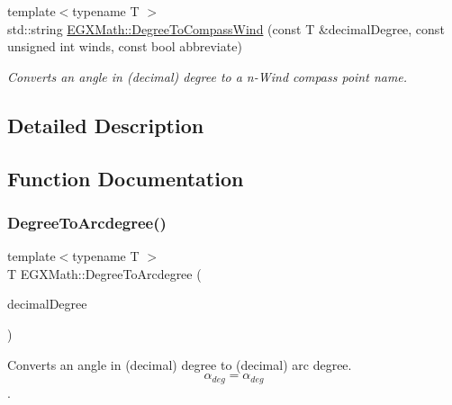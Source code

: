 \begin{DoxyCompactItemize}
{\footnotesize template$<$typename T $>$ }\\std\+::string \mbox{\hyperlink{group___e_g_x_math-_angle_conversions-_degree_ga5ffef873bcec300ab90570ad6e7b1ab1}{E\+G\+X\+Math\+::\+Degree\+To\+Compass\+Wind}} (const T \&decimal\+Degree, const unsigned int winds, const bool abbreviate)
\begin{DoxyCompactList}\small\item\em Converts an angle in (decimal) degree to a n-\/\+Wind compass point name. \end{DoxyCompactList}\end{DoxyCompactItemize}


\subsection{Detailed Description}


\subsection{Function Documentation}
\mbox{\label{group___e_g_x_math-_angle_conversions-_degree_gac1b5f3b68f66c77a6df4ceef842c9b19}} 
\subsubsection{\texorpdfstring{Degree\+To\+Arcdegree()}{DegreeToArcdegree()}}
{\footnotesize\ttfamily template$<$typename T $>$ \\
T E\+G\+X\+Math\+::\+Degree\+To\+Arcdegree (\begin{DoxyParamCaption}\item[{const T \&}]{decimal\+Degree }\end{DoxyParamCaption})}



Converts an angle in (decimal) degree to (decimal) arc degree. \[\alpha_{deg}=\alpha_{deg}\]. 

